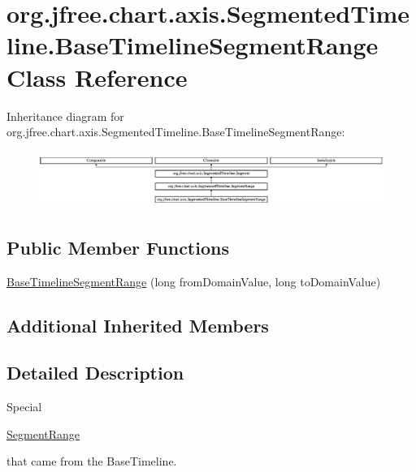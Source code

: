 \hypertarget{classorg_1_1jfree_1_1chart_1_1axis_1_1_segmented_timeline_1_1_base_timeline_segment_range}{}\section{org.\+jfree.\+chart.\+axis.\+Segmented\+Timeline.\+Base\+Timeline\+Segment\+Range Class Reference}
\label{classorg_1_1jfree_1_1chart_1_1axis_1_1_segmented_timeline_1_1_base_timeline_segment_range}
Inheritance diagram for org.\+jfree.\+chart.\+axis.\+Segmented\+Timeline.\+Base\+Timeline\+Segment\+Range\+:\begin{figure}[H]
\begin{center}
\leavevmode
\includegraphics[height=1.857380cm]{classorg_1_1jfree_1_1chart_1_1axis_1_1_segmented_timeline_1_1_base_timeline_segment_range}
\end{center}
\end{figure}
\subsection*{Public Member Functions}
\begin{DoxyCompactItemize}
\item 
\mbox{\hyperlink{classorg_1_1jfree_1_1chart_1_1axis_1_1_segmented_timeline_1_1_base_timeline_segment_range_aeb6407215582d99cba14acd7a1532b59}{Base\+Timeline\+Segment\+Range}} (long from\+Domain\+Value, long to\+Domain\+Value)
\end{DoxyCompactItemize}
\subsection*{Additional Inherited Members}


\subsection{Detailed Description}
Special
\begin{DoxyCode}
\mbox{\hyperlink{classorg_1_1jfree_1_1chart_1_1axis_1_1_segmented_timeline_1_1_segment_range_a36f8f53d5091e3429b4e81576fbd96e1}{SegmentRange}} 
\end{DoxyCode}
 that came from the Base\+Timeline. 

